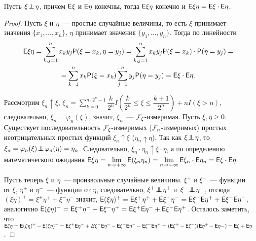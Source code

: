 \begin{theorem}
	Пусть $\xi \!\perp\!\!\!\!\perp\! \eta$, причем $\mathsf{E} \xi$ и $\mathsf{E} \eta$ конечны, тогда $\mathsf{E} \xi \eta$ конечно и $\mathsf{E} \xi \eta = \mathsf{E} \xi \cdot \mathsf{E} \eta$.
	\begin{proof}
		Пусть $\xi$ и $\eta$~--- простые случайные величины, то есть $\xi$ принимает значения $\{ x_1, \ldots, x_n \}$, $\eta$ принимает значения $\{ y_1, \ldots, y_n \}$. Тогда по линейности
		\begin{multline*}
			\mathsf{E} \xi \eta = \sum\limits_{k,j=1}^{n} x_k y_j \mathsf{P} (\xi = x_k, \eta = y_j) = \sum\limits_{k,j=1}^n x_k y_j \mathsf{P}(\xi = x_k) \cdot \mathsf{P}(\eta = y_j) = \\ = \sum\limits_{k = 1}^n x_k \mathsf{P} (\xi = x_k) \sum\limits_{j = 1}^{n} y_j \mathsf{P} (\eta = y_j) = \mathsf{E} \xi \cdot \mathsf{E} \eta.
		\end{multline*}
			
		Рассмотрим $\xi_n \uparrow \xi$, $\xi_n = \sum\limits_{k=0}^{n \cdot 2^n - 1} \dfrac{k}{2^n} I \left(\dfrac{k}{2^n} \leqslant \xi \leqslant \dfrac{k+1}{2^n} \right) + n I(\xi > n)$, следовательно, $\xi_n = \varphi_n(\xi)$, значит, $\xi_n$~--- $\mathcal{F}_\xi$-измеримая. Пусть $\xi, \eta \geqslant 0$. Существует последовательность $\mathcal{F}_\xi$-измеримых ($\mathcal{F}_\eta$-измеримых) простых неотрицательных простых функций $\xi_n \uparrow \xi$ ($\eta_n \uparrow \eta$). Так как $\xi \!\perp\!\!\!\!\perp\! \eta$, то $\xi_n = \varphi_n (\xi) \!\perp\!\!\!\!\perp\! \varphi_n(\eta) = \eta_n$. Следовательно, $\xi_n \cdot \eta_n \uparrow \xi \cdot \eta$, а по определению математического ожидания $\mathsf{E} \xi\eta = \lim\limits_{n \rightarrow +\infty} \mathsf{E} (\xi_n \eta_n) =  \lim\limits_{n \rightarrow +\infty} \mathsf{E} \xi_n \cdot \mathsf{E} \eta_n = \mathsf{E} \xi \cdot \mathsf{E} \eta$.
			
		Пусть теперь $\xi$ и $\eta$~--- произвольные случайные величины. $\xi^+$ и $\xi^-$~--- функции от $\xi$, $\eta^+$ и $\eta^-$~--- функции от $\eta$, следовательно, $\xi^+ \!\perp\!\!\!\!\perp\! \eta^+$ и $\xi^- \!\perp\!\!\!\!\perp\! \eta^-$, отсюда $(\xi \eta)^+ = \xi^+ \eta^+ + \xi^- \eta^-$ значит, $\mathsf{E} (\xi \eta)^+ = \mathsf{E} \xi^+ \eta^+ + \mathsf{E} \xi^- \eta^- = \mathsf{E} \xi^+ \mathsf{E} \eta^+ + \mathsf{E} \xi^- \mathsf{E} \eta^-$, аналогично $\mathsf{E} (\xi \eta)^- = \mathsf{E} \xi^+ \eta^- + \mathsf{E} \xi^- \eta^+ = \mathsf{E} \xi^+ \mathsf{E} \eta^- + \mathsf{E} \xi^- \mathsf{E} \eta^+$. Осталось заметить, что $\mathsf{E} \xi \eta = \mathsf{E} (\xi \eta)^+ - \mathsf{E} ( \xi \eta)^- = \mathsf{E} \xi^+ \mathsf{E} \eta^+ + E \xi^- \mathsf{E} \eta^- - \mathsf{E} \xi^+ \mathsf{E} \eta^- - \mathsf{E} \xi^- \mathsf{E} \eta^+ =  (\mathsf{E} \xi^+ - \mathsf{E} \xi^-) (\mathsf{E} \eta^+ - \mathsf{E} \eta-) = \mathsf{E} \xi + \mathsf{E} \eta$.
	\end{proof}
\end{theorem}
	
